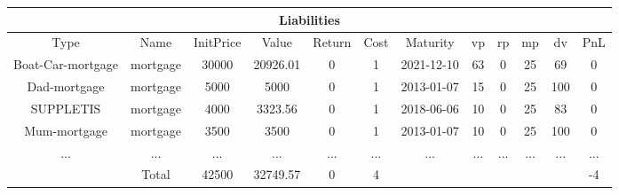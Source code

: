\begin{longtable}{|c|c|c|c|c|c|c|c|c|c|c|c|}
\hline
\multicolumn{12}{|c|}{Liabilities} \\
\hline
Type & Name & InitPrice & Value & Return & Cost & Maturity & vp & rp & mp & dv & PnL\\
\hline
Boat-Car-mortgage & mortgage & 30000 & 20926.01 & 0 & 1 & 2021-12-10 & 63 & 0 & 25 & 69 & 0\\
\hline
Dad-mortgage & mortgage & 5000 & 5000 & 0 & 1 & 2013-01-07 & 15 & 0 & 25 & 100 & 0\\
\hline
SUPPLETIS & mortgage & 4000 & 3323.56 & 0 & 1 & 2018-06-06 & 10 & 0 & 25 & 83 & 0\\
\hline
Mum-mortgage & mortgage & 3500 & 3500 & 0 & 1 & 2013-01-07 & 10 & 0 & 25 & 100 & 0\\
\hline
 ... & ... & ... & ... & ... & ... & ... & ... & ... & ... & ... & ...\\
\hline
& Total & 42500 & 32749.57 & 0 & 4 & & & & & & -4\\
\hline
\end{longtable}
